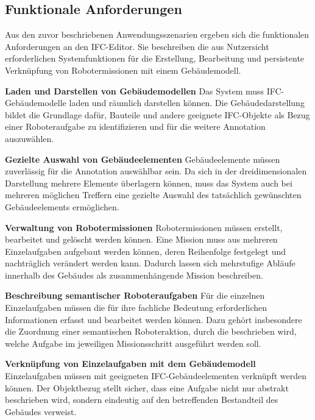 \subsection{Funktionale Anforderungen}
Aus den zuvor beschriebenen Anwendungsszenarien ergeben sich die funktionalen Anforderungen an den
IFC-Editor. Sie beschreiben die aus Nutzersicht erforderlichen Systemfunktionen für die
Erstellung, Bearbeitung und persistente Verknüpfung von Robotermissionen mit einem Gebäudemodell.

\textbf{Laden und Darstellen von Gebäudemodellen}\newline
Das System muss IFC-Gebäudemodelle laden und räumlich darstellen können. Die Gebäudedarstellung
bildet die Grundlage dafür, Bauteile und andere geeignete IFC-Objekte als Bezug einer Roboteraufgabe
zu identifizieren und für die weitere Annotation auszuwählen.

\textbf{Gezielte Auswahl von Gebäudeelementen}\newline
Gebäudeelemente müssen zuverlässig für die Annotation auswählbar sein. Da sich in der
dreidimensionalen Darstellung mehrere Elemente überlagern können, muss das System auch bei mehreren
möglichen Treffern eine gezielte Auswahl des tatsächlich gewünschten Gebäudeelements ermöglichen.

\textbf{Verwaltung von Robotermissionen}\newline
Robotermissionen müssen erstellt, bearbeitet und gelöscht werden können. Eine Mission muss aus
mehreren Einzelaufgaben aufgebaut werden können, deren Reihenfolge festgelegt und nachträglich verändert
werden kann. Dadurch lassen sich mehrstufige Abläufe innerhalb des Gebäudes als zusammenhängende
Mission beschreiben.

\textbf{Beschreibung semantischer Roboteraufgaben}\newline
Für die einzelnen Einzelaufgaben müssen die für ihre fachliche Bedeutung erforderlichen Informationen erfasst
und bearbeitet werden können. Dazu gehört insbesondere die Zuordnung einer semantischen
Roboteraktion, durch die beschrieben wird, welche Aufgabe im jeweiligen Missionsschritt ausgeführt
werden soll.

\textbf{Verknüpfung von Einzelaufgaben mit dem Gebäudemodell}\newline
Einzelaufgaben müssen mit geeigneten IFC-Gebäudeelementen verknüpft werden können. Der Objektbezug stellt
sicher, dass eine Aufgabe nicht nur abstrakt beschrieben wird, sondern eindeutig auf den
betreffenden Bestandteil des Gebäudes verweist.

